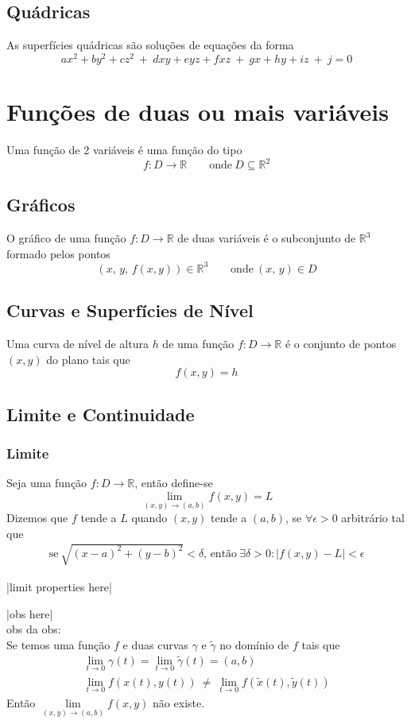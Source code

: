 \documentclass{article}
\begin{document}
\subsection{Quádricas}
As superfícies quádricas são soluções de equações da forma
\[ ax^2 + by^2 + cz^2 \> + \> dxy + eyz + fxz \> + \> gx + hy + iz \> + \> j = 0 \]


\section{Funções de duas ou mais variáveis}
Uma função de 2 variáveis é uma função do tipo
\[ f: D \rightarrow \mathbb{R} \qquad \text{onde} \> D \subseteq \mathbb{R}^2 \]

\subsection{Gráficos}
O gráfico de uma função $f: D \rightarrow \mathbb{R}$ de duas variáveis é o subconjunto de $\mathbb{R}^3$ formado pelos pontos
\[ (x,\, y,\, f(x, y)) \in \mathbb{R}^3 \qquad \text{onde} \> (x,\, y) \in D \]


\subsection{Curvas e Superfícies de Nível}
Uma curva de nível de altura $h$ de uma função $f: D \to \mathbb{R}$ é o conjunto de pontos $(x, y)$ do plano tais que
\[ f(x,y) = h \]


\pagebreak

\subsection{Limite e Continuidade}

\subsubsection{Limite}
Seja uma função $f: D \rightarrow \mathbb{R}$, então define-se
\[ \lim_{(x,y) \to (a,b)} f(x,y) = L \]
Dizemos que $f$ tende a $L$ quando $(x,y)$ tende a $(a,b)$, se $\forall \epsilon > 0$ arbitrário tal que
\begin{gather*}
  \text{se} \> \sqrt{ {(x-a)}^2 + {(y-b)}^2 } < \delta \text{, então} \> \exists \delta > 0: \left| f(x,y) - L \right| < \epsilon
\end{gather*}
\centerline{|limit properties here|}
|obs here|\\
obs da obs:\\
Se temos uma função $f$ e duas curvas $\gamma$ e $\widetilde\gamma$ no domínio de $f$ tais que
\begin{gather*}
  \lim_{t \to 0} \gamma(t) = \lim_{t \to 0} \widetilde\gamma(t) = (a,b) \\
  \lim_{t \to 0} f(x(t), y(t)) \> \neq \> \lim_{t \to 0} f(\widetilde{x}(t), \widetilde{y}(t))
\end{gather*}
Então $\lim\limits_{(x,y) \to (a,b)} f(x,y)$ não existe.
\end{document}
